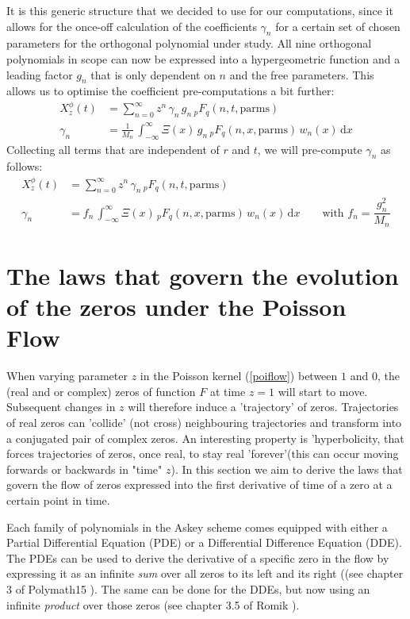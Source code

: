 \documentclass[a4paper,11pt,twoside]{amsart}
\newcommand{\verifiedeq}{=}
\newcommand{\verifiedeq}{\stackrel{\checkmark}{=}}
\begin{document}
It is this generic structure that we decided to use for our computations, since it allows for the once-off calculation of the coefficients $\gamma_n$ for a certain set of chosen parameters for the orthogonal polynomial under study. All nine orthogonal polynomials in scope can now be expressed into a hypergeometric function and a leading factor $g_n$ that is only dependent on $n$ and the free parameters. This allows us to optimise the coefficient pre-computations a bit further:
\begin{align}
 X^\phi_z(t) &\verifiedeq \sum_{n=0}^\infty z^n\,\gamma_n\,g_n\,{}_pF_q(n,t,\text{parms})\\
 \gamma_n &\verifiedeq  \frac{1}{M_n}\,\int_{-\infty}^\infty \Xi(x)\, g_n\,{}_pF_q(n,x, \text{parms})\,w_n(x) \,\mathrm{d}x
\end{align} 
Collecting all terms that are independent of $r$ and $t$, we will pre-compute $\gamma_n$ as follows:
\begin{align}
 X^\phi_z(t) &\verifiedeq \sum_{n=0}^\infty z^n\,\gamma_n\,{}_pF_q(n,t, \text{parms}) \\
 \gamma_n &\verifiedeq  f_n\,\int_{-\infty}^\infty \Xi(x)\,{}_pF_q(n,x,\text{parms})\,w_n(x) \,\mathrm{d}x \qquad \text{with } f_n = \dfrac{g_n^2}{M_n} 
\end{align} 
\pagebreak

\section{The laws that govern the evolution of the zeros under the Poisson Flow} \label{lawspoissonflow}
When varying parameter $z$ in the Poisson kernel (\ref{poiflow}) between $1$ and $0$, the (real and or complex) zeros of function $F$ at time $z=1$ will start to move. Subsequent changes in $z$ will therefore induce a 'trajectory' of zeros. Trajectories of real zeros can 'collide' (not cross) neighbouring trajectories and transform  into a conjugated pair of complex zeros. An interesting property is 'hyperbolicity, that forces trajectories of zeros, once real, to stay real 'forever'(this can occur moving forwards or backwards in "time" $z$). In this section we aim to derive the laws that govern the flow of zeros expressed into the first derivative of time of a zero at a certain point in time. 

Each family of polynomials in the Askey scheme comes equipped with either a Partial Differential Equation (PDE) or a Differential Difference Equation (DDE). The PDEs can be used to derive the derivative of a specific zero in the flow by expressing it as an infinite \textit{sum} over all zeros to its left and its right ((see chapter 3 of Polymath15 \cite{pol}). The same can be done for the DDEs, but now using an infinite \textit{product} over those zeros (see chapter 3.5 of Romik \cite{rom}). 
\end{document}
